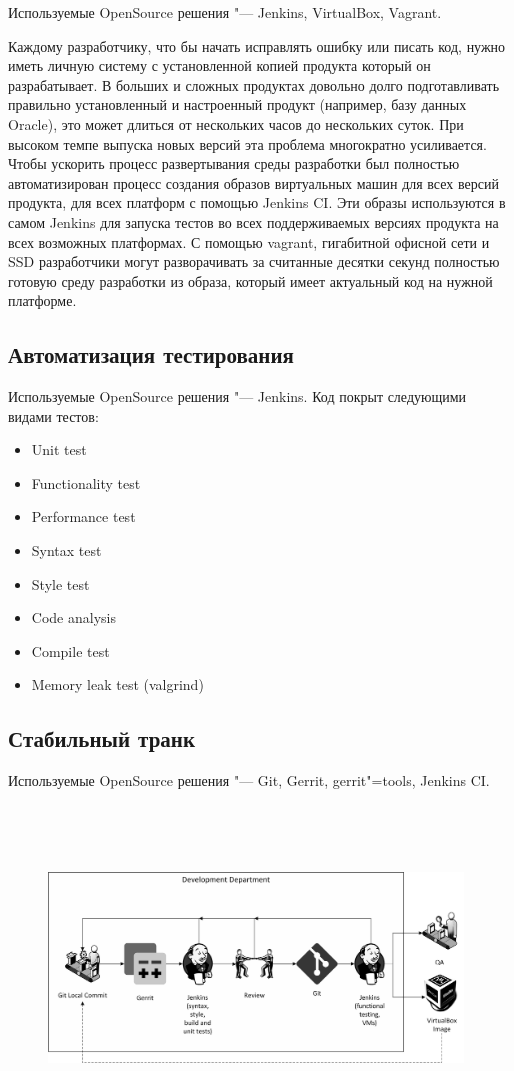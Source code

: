 \documentclass[10pt, a5paper]{article}
\begin{document}
Используемые OpenSource решения "--- Jenkins, VirtualBox, Vagrant.

Каждому разработчику, что бы начать исправлять ошибку или писать код, нужно иметь личную систему с установленной копией продукта который он разрабатывает. В больших и сложных продуктах довольно долго подготавливать правильно установленный и настроенный продукт (например, базу данных Oracle), это может длиться от нескольких часов до нескольких суток. При высоком темпе выпуска новых версий эта проблема многократно усиливается. Чтобы ускорить процесс развертывания среды разработки был полностью автоматизирован процесс создания образов виртуальных машин для всех версий продукта, для всех платформ с помощью Jenkins CI. Эти образы используются в самом Jenkins для запуска тестов во всех поддерживаемых версиях продукта на всех возможных платформах. С помощью vagrant, гигабитной офисной сети и SSD разработчики могут разворачивать за считанные десятки секунд полностью готовую среду разработки из образа, который имеет актуальный код на нужной платформе.

\subsection*{Автоматизация тестирования}

Используемые OpenSource решения "--- Jenkins.
Код покрыт следующими видами тестов:

\begin{itemize}
  \item Unit test
  \item Functionality test
  \item Performance test
  \item Syntax test
  \item Style test
  \item Code analysis
  \item Compile test
  \item Memory leak test (valgrind)
\end{itemize}

\subsection*{Стабильный транк}

Используемые OpenSource решения "--- Git, Gerrit, gerrit"=tools, Jenkins CI.

~

~

\begin{figure}[b]
  \centering
  \includegraphics[width=11cm]{05_review.png} 
\end{figure}
\end{document}
